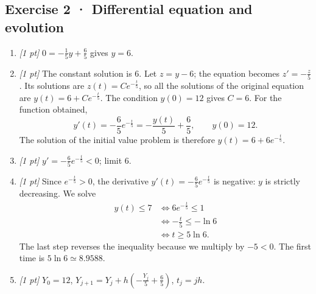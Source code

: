 \subsection*{Exercise 2 · Differential equation and evolution}\begin{enumerate}

\item \textit{[1 pt]} $0=-\frac{1}{5}y+\frac{6}{5}$ gives $y=6$.

\item \textit{[1 pt]} The constant solution is $6$. Let $z=y-6$; the equation becomes $z'=-\frac{z}{5}$. Its solutions are $z(t)=Ce^{-\frac{t}{5}}$, so all the solutions of the original equation are $y(t)=6+Ce^{-\frac{t}{5}}$.
The condition $y(0)=12$ gives $C=6$. For the function obtained,
\[y'(t)=-\frac{6}{5}e^{-\frac{t}{5}}=-\frac{y(t)}{5}+\frac{6}{5},\qquad y(0)=12.\]
The solution of the initial value problem is therefore $y(t)=6+6e^{-\frac{t}{5}}$.

\item \textit{[1 pt]} $y'=-\frac{6}{5}e^{-\frac{t}{5}}<0$; limit $6$.

\item \textit{[1 pt]} Since $e^{-\frac{t}{5}}>0$, the derivative $y'(t)=-\frac{6}{5}e^{-\frac{t}{5}}$ is negative: $y$ is strictly decreasing. We solve
\[\begin{aligned}y(t)\le 7&\Longleftrightarrow 6e^{-\frac{t}{5}}\le1\\&\Longleftrightarrow -\frac{t}{5}\le-\ln 6\\&\Longleftrightarrow t\ge 5\ln 6.\end{aligned}\]
The last step reverses the inequality because we multiply by $-5<0$. The first time is $5\ln 6\simeq\num{8,9588}$.

\item \textit{[1 pt]} $Y_0=12$, $Y_{j+1}=Y_j+h(-\frac{Y_j}{5}+\frac{6}{5})$, $t_j=jh$.

\end{enumerate}

